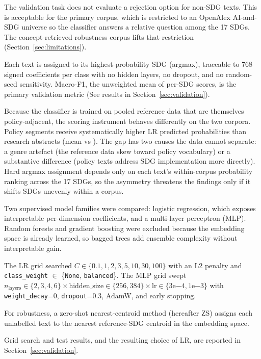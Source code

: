 \documentclass[12pt,a4paper]{article}
\begin{document}
 The validation task does not evaluate a rejection option for non-SDG texts. This is acceptable for the primary corpus, which is restricted to an OpenAlex AI-and-SDG universe so the classifier answers a relative question among the 17 SDGs. The concept-retrieved robustness corpus lifts that restriction (Section~\ref{sec:limitations}).

Each text is assigned to its highest-probability SDG (argmax), traceable to 768 signed coefficients per class with no hidden layers, no dropout, and no random-seed sensitivity. Macro-F1, the unweighted mean of per-SDG scores, is the primary validation metric (See results in Section~\ref{sec:validation}).

Because the classifier is trained on pooled reference data that are themselves policy-adjacent, the scoring instrument behaves differently on the two corpora. Policy segments receive systematically higher LR predicted probabilities than research abstracts (mean \AffFifteenPolicyScore{} vs \AffFifteenPaperScore{}). The gap has two causes the data cannot separate: a genre artefact (the reference data skew toward policy vocabulary) or a substantive difference (policy texts address SDG implementation more directly). Hard argmax assignment depends only on each text's within-corpus probability ranking across the 17 SDGs, so the asymmetry threatens the findings only if it shifts SDGs unevenly within a corpus.

Two supervised model families were compared: logistic regression, which exposes interpretable per-dimension coefficients, and a multi-layer perceptron (MLP). Random forests and gradient boosting were excluded because the embedding space is already learned, so bagged trees add ensemble complexity without interpretable gain.

The LR grid searched $C \in \{0.1, 1, 2, 3, 5, 10, 30, 100\}$ with an L2 penalty and \texttt{class\_weight} $\in$ \{\texttt{None}, \texttt{balanced}\}. The MLP grid swept $n_{\text{layers}} \in \{2, 3, 4, 6\} \times \text{hidden\_size} \in \{256, 384\} \times \text{lr} \in \{3\mathrm{e}{-4}, 1\mathrm{e}{-3}\}$ with \texttt{weight\_decay}=0, \texttt{dropout}=0.3, AdamW, and early stopping.

For robustness, a zero-shot nearest-centroid method (hereafter ZS) assigns each unlabelled text to the nearest reference-SDG centroid in the embedding space.

Grid search and test results, and the resulting choice of LR, are reported in Section~\ref{sec:validation}.
\end{document}
